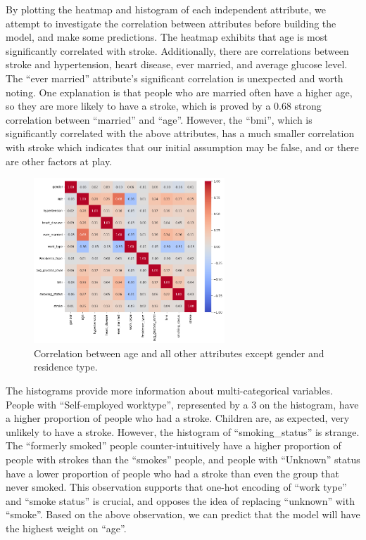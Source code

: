 \documentclass[11pt]{article}
\begin{document}
By plotting the heatmap and histogram of each independent attribute, we attempt to investigate the correlation between attributes before building the model, and make some predictions. The heatmap exhibits that age is most significantly correlated with stroke. Additionally, there are correlations between stroke and hypertension, heart disease, ever married, and average glucose level.  The “ever married” attribute’s significant correlation is unexpected and worth noting. One explanation is that people who are married often have a higher age, so they are more likely to have a stroke, which is proved by a 0.68 strong correlation between “married” and “age”. However, the “bmi”, which is significantly correlated with the above attributes, has a much smaller correlation with stroke which indicates that our initial assumption may be false, and or there are other factors at play.

\begin{figure}[htbp!]
\centering
\includegraphics[width=0.64\textwidth]{CorrelationPlot.png}
\caption{Correlation between age and all other attributes except gender and residence type.}
\end{figure}


The histograms provide more information about multi-categorical variables. People with “Self-employed worktype”, represented by a 3 on the histogram, have a higher proportion of people who had a stroke. Children are, as expected, very unlikely to have a stroke. However, the histogram of “smoking\_status” is strange. The “formerly smoked” people counter-intuitively have a higher proportion of people with strokes than the “smokes” people, and people with “Unknown” status have a lower proportion of people who had a stroke than even the group that never smoked. This observation supports that one-hot encoding of “work type” and “smoke status” is crucial, and opposes the idea of replacing “unknown” with “smoke”. 
Based on the above observation, we can predict that the model will have the highest weight on “age”.
\end{document}
